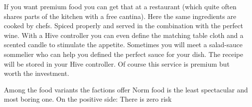 If you want premium food you can get that at a restaurant (which quite often shares parts of the kitchen with a free cantina). Here the same ingredients are cooked by chefs. Spiced properly and served in the combination with the perfect wine. With a Hive controller you can even define the matching table cloth and a scented candle to stimulate the appetite.
Sometimes you will meet a salad-sauce sommelier who can help you defined the perfect sauce for your dish. The receipe will be stored in your Hive controller. Of course this service is premium but worth the investment.

Among the food variants the factions offer Norm food is the least spectacular and most boring one. On the positive side: There is zero risk

